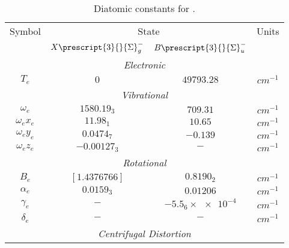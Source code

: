 \documentclass[11pt, twoside, fleqn]{report}
\newcommand{\state}[2]{\prescript{#1}{}{#2}}
\begin{document}
\begin{table}[H]
    \centering
    \caption{Diatomic constants for  \cite{nist:diatomic}.}
    \label{t:diatomic_constants_for_o2}
    \begin{tabular}{cccc}
        \toprule
        Symbol            & \multicolumn{2}{c}{State}    & Units                                           \\
        \cmidrule(lr){2-3}
                          & $X\state{3}{\Sigma}_{g}^{-}$ & $B\state{3}{\Sigma}_{u}^{-}$ &                  \\
        \midrule
        \multicolumn{4}{c}{\textit{Electronic}}                                                            \\
        \cmidrule(lr){1-4}
        $T_{e}$           & $0$                          & $49793.28$                   & $\unit{cm^{-1}}$ \\
        \multicolumn{4}{c}{\textit{Vibrational}}                                                           \\
        \cmidrule(lr){1-4}
        $\omega_{e}$      & $1580.19_{3}$                & $709.31$                     & $\unit{cm^{-1}}$ \\
        $\omega_{e}x_{e}$ & $11.98_{1}$                  & $10.65$                      & $\unit{cm^{-1}}$ \\
        $\omega_{e}y_{e}$ & $0.0474_{7}$                 & $-0.139$                     & $\unit{cm^{-1}}$ \\
        $\omega_{e}z_{e}$ & $-0.00127_{3}$               & $-$                          & $\unit{cm^{-1}}$ \\
        \multicolumn{4}{c}{\textit{Rotational}}                                                            \\
        \cmidrule(lr){1-4}
        $B_{e}$           & $[1.4376766]$                & $0.8190_{2}$                 & $\unit{cm^{-1}}$ \\
        $\alpha_{e}$      & $0.0159_{3}$                 & $0.01206$                    & $\unit{cm^{-1}}$ \\
        $\gamma_{e}$      & $-$                          & $-5.5_{6}\times\num{e-4}$    & $\unit{cm^{-1}}$ \\
        $\delta_{e}$      & $-$                          & $-$                          & $\unit{cm^{-1}}$ \\
        \multicolumn{4}{c}{\textit{Centrifugal Distortion}}                                                \\

\end{tabular}
\end{table}
\end{document}
